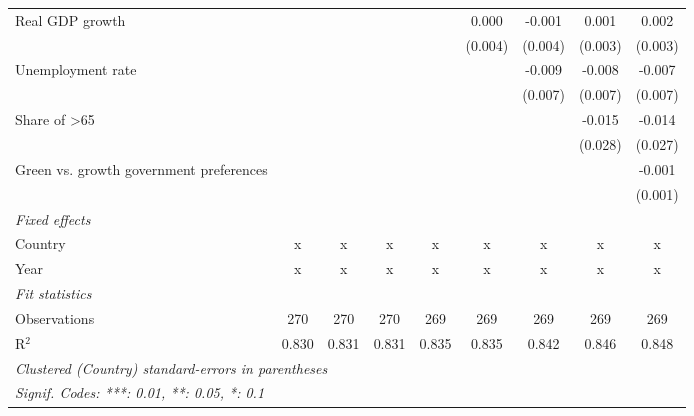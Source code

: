 \begin{table}[htbp]
\begin{tabular}{lcccccccc}
      Real GDP growth                         &         &         &         &         & 0.000   & -0.001  & 0.001   & 0.002\\   
                                              &         &         &         &         & (0.004) & (0.004) & (0.003) & (0.003)\\   
      Unemployment rate                       &         &         &         &         &         & -0.009  & -0.008  & -0.007\\   
                                              &         &         &         &         &         & (0.007) & (0.007) & (0.007)\\   
      Share of >65                            &         &         &         &         &         &         & -0.015  & -0.014\\   
                                              &         &         &         &         &         &         & (0.028) & (0.027)\\   
      Green vs. growth government preferences &         &         &         &         &         &         &         & -0.001\\   
                                              &         &         &         &         &         &         &         & (0.001)\\   
      \emph{Fixed effects}\\
      Country                                 & x       & x       & x       & x       & x       & x       & x       & x\\  
      Year                                    & x       & x       & x       & x       & x       & x       & x       & x\\  
      \midrule \emph{Fit statistics}\\
      Observations                            & 270     & 270     & 270     & 269     & 269     & 269     & 269     & 269\\  
      R$^2$                                   & 0.830   & 0.831   & 0.831   & 0.835   & 0.835   & 0.842   & 0.846   & 0.848\\  
      \midrule
      \multicolumn{9}{l}{\emph{Clustered (Country) standard-errors in parentheses}}\\
      \multicolumn{9}{l}{\emph{Signif. Codes: ***: 0.01, **: 0.05, *: 0.1}}\\
   \end{tabular}
\end{table}


